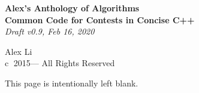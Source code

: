 \begin{titlepage}
	\centering
	
	\vspace*{6 cm}
	
	\textbf{\LARGE Alex's Anthology of Algorithms}
	\\[1.0\baselineskip]
	\textbf{\Large Common Code for Contests in Concise C++}
	\\[1.0\baselineskip]
	{\large\textit{Draft v0.9, Feb 16, 2020}}
	
	\vspace*{11 cm}
	
	{\Large Alex Li}
	\\[0.5\baselineskip]
	{\small \textcircled{c} 2015--- All Rights Reserved}
\end{titlepage}

\pagebreak
\vspace*{8 cm}
\centering

{\large This page is intentionally left blank.}

\vspace{\fill}
\makeatletter
